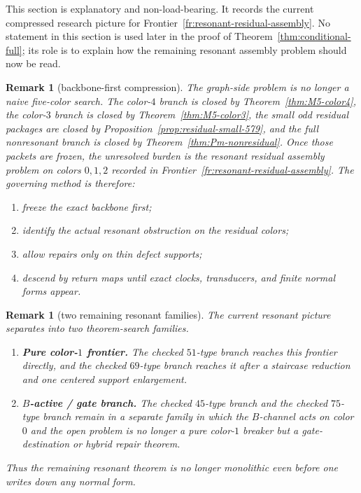 \documentclass[11pt]{article}
\newtheorem{remark}[theorem]{Remark}
\begin{document}
This section is explanatory and non-load-bearing.
It records the current compressed research picture for
Frontier~\ref{fr:resonant-residual-assembly}.
No statement in this section is used later in the proof of
Theorem~\ref{thm:conditional-full}; its role is to explain how the remaining
resonant assembly problem should now be read.

\begin{remark}[backbone-first compression]
The graph-side problem is no longer a naive five-color search.
The color-$4$ branch is closed by Theorem~\ref{thm:M5-color4}, the color-$3$
branch is closed by Theorem~\ref{thm:M5-color3}, the small odd residual
packages are closed by Proposition~\ref{prop:residual-small-579}, and the full
nonresonant branch is closed by Theorem~\ref{thm:Pm-nonresidual}.
Once those packets are frozen, the unresolved burden is the resonant residual
assembly problem on colors $0,1,2$ recorded in
Frontier~\ref{fr:resonant-residual-assembly}.
The governing method is therefore:
\begin{enumerate}[label=\textup{(\arabic*)},leftmargin=2.8em]
\item freeze the exact backbone first;
\item identify the actual resonant obstruction on the residual colors;
\item allow repairs only on thin defect supports;
\item descend by return maps until exact clocks, transducers, and finite
      normal forms appear.
\end{enumerate}
\end{remark}

\begin{remark}[two remaining resonant families]
The current resonant picture separates into two theorem-search families.
\begin{enumerate}[label=\textup{(\arabic*)},leftmargin=2.8em]
\item \textbf{Pure color-$1$ frontier.}
      The checked $51$-type branch reaches this frontier directly, and the
      checked $69$-type branch reaches it after a staircase reduction and one
      centered support enlargement.
\item \textbf{$B$-active / gate branch.}
      The checked $45$-type branch and the checked $75$-type branch remain in a
      separate family in which the $B$-channel acts on color $0$ and the open
      problem is no longer a pure color-$1$ breaker but a gate-destination or
      hybrid repair theorem.
\end{enumerate}
Thus the remaining resonant theorem is no longer monolithic even before one
writes down any normal form.
\end{remark}
\end{document}
